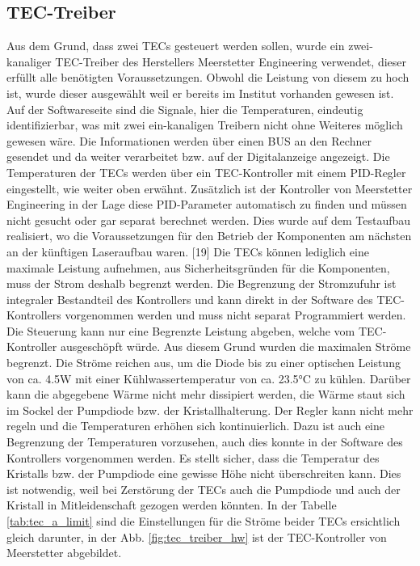 \subsection{TEC-Treiber}
\label{label_tec_treiber}
Aus dem Grund, dass zwei TECs gesteuert werden sollen, wurde ein zwei-kanaliger TEC-Treiber des Herstellers Meerstetter Engineering verwendet, dieser erfüllt alle benötigten Voraussetzungen. Obwohl die Leistung von diesem zu hoch ist, wurde dieser ausgewählt weil er bereits im Institut vorhanden gewesen ist.\\
Auf der Softwareseite sind die Signale, hier die Temperaturen, eindeutig identifizierbar, was mit zwei ein-kanaligen Treibern nicht ohne Weiteres möglich gewesen wäre. Die Informationen werden über einen BUS an den Rechner gesendet und da weiter verarbeitet bzw. auf der Digitalanzeige angezeigt.
Die Temperaturen der TECs werden über ein TEC-Kontroller mit einem PID-Regler eingestellt, wie weiter oben erwähnt. Zusätzlich ist der Kontroller von Meerstetter Engineering in der Lage diese PID-Parameter automatisch zu finden und müssen nicht gesucht oder gar separat berechnet werden. Dies wurde auf dem Testaufbau realisiert, wo die Voraussetzungen für den Betrieb der Komponenten am nächsten an der künftigen Laseraufbau waren. [19]
Die TECs können lediglich eine maximale Leistung aufnehmen, aus Sicherheitsgründen für die Komponenten, muss der Strom deshalb begrenzt werden. Die Begrenzung der Stromzufuhr ist integraler Bestandteil des Kontrollers und kann direkt in der Software des TEC-Kontrollers vorgenommen werden und muss nicht separat Programmiert werden. Die Steuerung kann nur eine Begrenzte Leistung abgeben, welche vom TEC-Kontroller ausgeschöpft würde. Aus diesem Grund wurden die maximalen Ströme begrenzt. Die Ströme reichen aus, um die Diode bis zu einer optischen Leistung von ca. 4.5W mit einer Kühlwassertemperatur von ca. 23.5°C zu kühlen. Darüber kann die abgegebene Wärme nicht mehr dissipiert werden, die Wärme staut sich im Sockel der Pumpdiode bzw. der Kristallhalterung. Der Regler kann nicht mehr regeln und die Temperaturen erhöhen sich kontinuierlich. Dazu ist auch eine Begrenzung der Temperaturen vorzusehen, auch dies konnte in der Software des Kontrollers vorgenommen werden. Es stellt sicher, dass die Temperatur des Kristalls bzw. der Pumpdiode eine gewisse Höhe nicht überschreiten kann. Dies ist notwendig, weil bei Zerstörung der TECs auch die Pumpdiode und auch der Kristall in Mitleidenschaft gezogen werden könnten. In der Tabelle \ref{tab:tec_a_limit} sind die Einstellungen für die Ströme beider TECs ersichtlich gleich darunter, in der  Abb. \ref{fig:tec_treiber_hw} ist der TEC-Kontroller von Meerstetter abgebildet.

